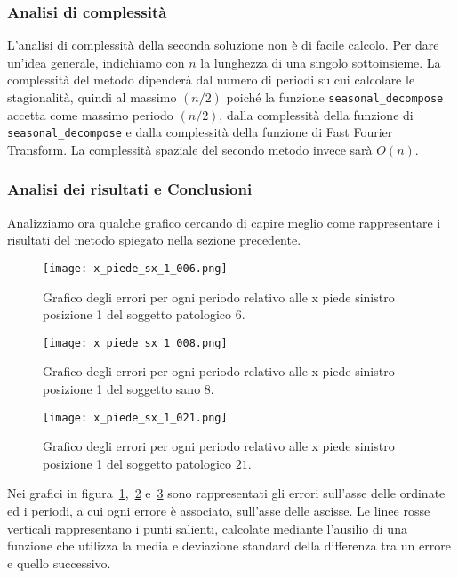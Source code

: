 \subsubsection{Analisi di complessità}
L'analisi di complessità della seconda soluzione non è di facile calcolo. Per dare un'idea
generale, indichiamo con $n$ la lunghezza di una singolo sottoinsieme. La complessità 
del metodo dipenderà dal numero di periodi su cui calcolare le stagionalità,
quindi al massimo $(n/2)$ poiché la funzione \texttt{seasonal\_decompose} accetta come massimo
periodo $(n/2)$, dalla complessità della funzione di \texttt{seasonal\_decompose} e dalla 
complessità della funzione di Fast Fourier Transform.
La complessità spaziale del secondo metodo invece sarà $O(n)$.


\subsubsection{Analisi dei risultati e Conclusioni}
Analizziamo ora qualche grafico cercando di capire meglio come rappresentare i risultati del metodo
spiegato nella sezione precedente.
\begin{figure}[H]
    \centering
    \texttt{[image: x\_piede\_sx\_1\_006.png]}
    \caption{Grafico degli errori per ogni periodo relativo alle x piede sinistro posizione 1 del soggetto patologico $6$.}
    \label{fig:x_piede_sx_1_006_m2}
\end{figure}
\begin{figure}[H]
    \centering
    \texttt{[image: x\_piede\_sx\_1\_008.png]}
    \caption{Grafico degli errori per ogni periodo relativo alle x piede sinistro posizione 1 del soggetto sano $8$.}
    \label{fig:x_piede_sx_1_008_m2}
\end{figure}
\begin{figure}[H]
    \centering
    \texttt{[image: x\_piede\_sx\_1\_021.png]}
    \caption{Grafico degli errori per ogni periodo relativo alle x piede sinistro posizione 1 del soggetto patologico $21$.}
    \label{fig:x_piede_sx_1_021_m2}
\end{figure}

Nei grafici in figura~\ref*{fig:x_piede_sx_1_006_m2},~\ref*{fig:x_piede_sx_1_008_m2} e~\ref*{fig:x_piede_sx_1_021_m2}
sono rappresentati gli errori sull'asse delle ordinate ed i periodi, a cui ogni errore è associato,
sull'asse delle ascisse. Le linee rosse verticali rappresentano i punti salienti, calcolate mediante
l'ausilio di una funzione che utilizza la media e deviazione standard della differenza tra un errore 
e quello successivo.


